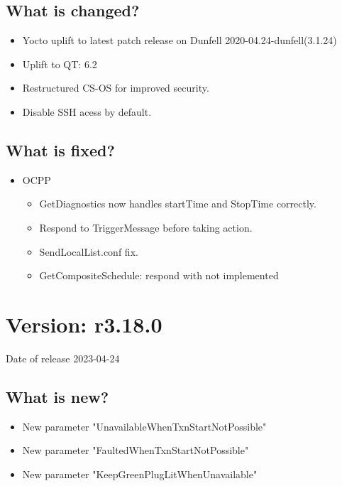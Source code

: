 \documentclass{scrartcl}
\begin{document}
\subsection*{What is changed?}

\begin{itemize}
\item Yocto uplift to latest patch release on Dunfell 2020-04.24-dunfell(3.1.24)
\item Uplift to QT: 6.2
\item Restructured CS-OS for improved security.
\item Disable SSH acess by default.
\end{itemize}

\subsection*{What is fixed?}

\begin{itemize}
\item OCPP
    \begin{itemize}
    \item GetDiagnostics now handles startTime and StopTime correctly.
    \item Respond to TriggerMessage before taking action.
    \item SendLocalList.conf fix.
    \item GetCompositeSchedule: respond with not implemented
\end{itemize}
\end{itemize}


\section{Version: r3.18.0}
Date of release 2023-04-24

\subsection*{What is new?}

\begin{itemize}
\item New parameter "UnavailableWhenTxnStartNotPossible"
\item New parameter "FaultedWhenTxnStartNotPossible"
\item New parameter "KeepGreenPlugLitWhenUnavailable"

\end{itemize}
\end{document}
